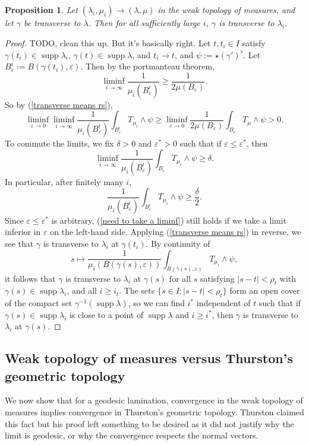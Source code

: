 \documentclass[reqno,10pt]{amsart}
\DeclareMathOperator{\supp}{supp}
\newtheorem{proposition}[theorem]{Proposition}
\theoremstyle{definition}
\numberwithin{equation}{section}
\begin{document}
\begin{proposition}
Let $(\lambda_i, \mu_i) \to (\lambda, \mu)$ in the weak topology of measures, and let $\gamma$ be transverse to $\lambda$.
Then for all sufficiently large $i$, $\gamma$ is transverse to $\lambda_i$.
\end{proposition}
\begin{proof}
TODO, clean this up. But it's basically right.
Let $t, t_i \in I$ satisfy $\gamma(t_i) \in \supp \lambda_i$, $\gamma(t) \in \supp \lambda$, and $t_i \to t$, and $\psi := \star (\gamma')^\flat$.
Let $B_\varepsilon^i := B(\gamma(t_i), \varepsilon)$.
Then by the portmanteau theorem,
$$\liminf_{i \to \infty} \frac{1}{\mu_i(B_\varepsilon^i)} \geq \frac{1}{2\mu(B_\varepsilon)}.$$
So by (\ref{transverse means rs}), 
$$\liminf_{\varepsilon \to 0} \liminf_{i \to \infty} \frac{1}{\mu_i(B_\varepsilon^i)} \int_{B_\varepsilon^i} T_{\mu_i} \wedge \psi \geq \liminf_{\varepsilon \to 0} \frac{1}{2\mu(B_\varepsilon)} \int_{B_\varepsilon} T_\mu \wedge \psi > 0.$$
To commute the limits, we fix $\delta > 0$ and $\varepsilon^* > 0$ such that if $\varepsilon \leq \varepsilon^*$, then
$$\liminf_{i \to \infty} \frac{1}{\mu_i(B_\varepsilon^i)} \int_{B_\varepsilon} T_{\mu_i} \wedge \psi \geq \delta.$$
In particular, after finitely many $i$, 
\begin{equation}\label{need to take a liminf}
\frac{1}{\mu_i(B_\varepsilon^i)} \int_{B_\varepsilon^i} T_{\mu_i} \wedge \psi \geq \frac{\delta}{2}.
\end{equation}
Since $\varepsilon \leq \varepsilon^*$ is arbitrary, (\ref{need to take a liminf}) still holds if we take a limit inferior in $\varepsilon$ on the left-hand side.
Applying (\ref{transverse means rs}) in reverse, we see that $\gamma$ is transverse to $\lambda_i$ at $\gamma(t_i)$.
By continuity of
$$s \mapsto \frac{1}{\mu_i(B(\gamma(s), \varepsilon))} \int_{B(\gamma(s), \varepsilon)} T_{\mu_i} \wedge \psi,$$
it follows that $\gamma$ is transverse to $\lambda_i$ at $\gamma(s)$ for all $s$ satisfying $|s - t| < \rho_t$ with $\gamma(s) \in \supp \lambda_i$, and all $i \geq i_t$.
The sets $\{s \in I: |s - t| < \rho_t\}$ form an open cover of the compact set $\gamma^{-1}(\supp \lambda)$, so we can find $i^*$ independent of $t$ such that if $\gamma(s) \in \supp \lambda_i$ is close to a point of $\supp \lambda$ and $i \geq i^*$, then $\gamma$ is transverse to $\lambda_i$ at $\gamma(s)$.
\end{proof}

\subsection{Weak topology of measures versus Thurston's geometric topology}
We now show that for a geodesic lamination, convergence in the weak topology of measures implies convergence in Thurston's geometric topology.
Thurston claimed this fact \cite[Proposition 8.10.3]{thurston1979geometry} but his proof left something to be desired as it did not justify why the limit is geodesic, or why the convergence respects the normal vectors.
\end{document}
